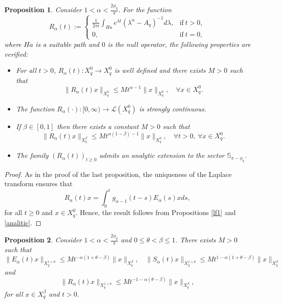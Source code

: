 \documentclass[12pt,reqno]{amsart}
\newtheorem{pr}{Proposition}
\newcommand{\Le}{\mathcal{L}}%
\begin{document}
	
	\begin{pr}\label{lf3} Consider $1<\alpha<\frac{2\phi_q}{\pi}$. For the function 
		\begin{equation*}%
			R_{\alpha}(t):=\left\{\begin{array}{ll}\displaystyle \frac{1}{2\pi i}\int_{Ha}e^{\lambda t}(\lambda^{\alpha}-A_q)^{-1}d\lambda, &  \mbox{if} ~  t> 0,\\
				0, &  \mbox{if} ~ t=0,\end{array}\right.
		\end{equation*}
		where $Ha$ is a suitable path and $0$ is the null operator, the following properties are verified:
		\begin{itemize}
			\item[$(i)$] For all $t>0$, $R_{\alpha}(t):X^{0}_{q}\to X^{0}_{q}$ is well defined and there exists $M>0$ such that 
			$$\|R_{\alpha}(t)x\|_{X^{0}_{q}}\leq Mt^{\alpha-1}\|x\|_{X^{0}_{q}}, \quad  \forall x\in X^{0}_{q}.$$ 
			\item[$(ii)$] The function $R_{\alpha}(\cdot ):[0,\infty)\rightarrow \Le(X^{0}_{q})$ is strongly continuous.
			\item[$(iii)$] If  $\beta\in[0, 1]$ then there exists a constant $M>0$ such that 
			$$\|R_{\alpha}(t)x\|_{X^{\beta}_{q}}\leq M t^{\alpha(1-\beta)-1}\|x\|_{X^{0}_{q}},\quad \forall t>0, \ \forall x\in X^{0}_{q}.$$
			\item[$(iv)$] The family $(R_\alpha(t))_{t\ge0}$ admits an analytic extension to the sector $\mathbb{S}_{\pi-\phi_q}.$
		\end{itemize} 
	\end{pr}
	
	\begin{proof}
		As in the proof of the last proposition,  the uniqueness of the Laplace transform ensures that
		$$R_{\alpha}(t)x=\int_{0}^{t}g_{\alpha-1}(t-s)E_{\alpha}(s)xds,$$
		for all $t\ge0$ and $x\in X^{0}_{q}$. Hence, the result follows from Propositions \ref{lf1} and \ref{analitic}.
	\end{proof}
	
	
	
	
	\begin{pr}\label{compinter}
		Consider $1<\alpha<\frac{2\phi_q}{\pi}$ and $0\le\theta<\beta\le 1$. There exists $M>0$ such that
		\begin{equation*}
			\|E_{\alpha}(t)x\|_{X^{1+\theta}_{q}}\leq Mt^{-\alpha(1+\theta-\beta)}\|x\|_{X^{\beta}_{q}},\quad \|S_{\alpha}(t)x\|_{X^{1+\theta}_{q}}\leq Mt^{1-\alpha(1+\theta-\beta)}\|x\|_{X^{\beta}_{q}}
		\end{equation*}
		and
		\begin{equation*}
			\|R_{\alpha}(t)x\|_{X^{1+\theta}_{q}}\leq Mt^{-1-\alpha(\theta-\beta)}\|x\|_{X^{\beta}_{q}},
		\end{equation*}
		for all $x\in X^{\beta}_{q}$ and $t>0$. 
	\end{pr}
	
\end{document}

